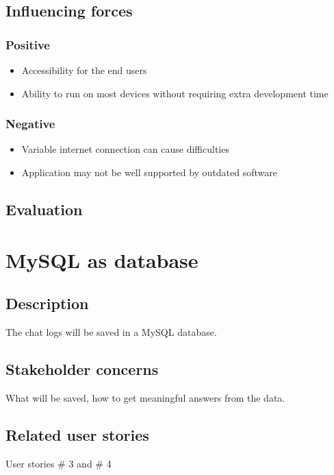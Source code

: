 \documentclass[12pt, a4paper]{article}
\begin{document}
\subsection{Influencing forces}
\begin{minipage}{0.5\textwidth}
    \subsubsection*{Positive}
    \begin{itemize}
        \item Accessibility for the end users
        \item Ability to run on most devices without requiring extra development time
    \end{itemize}
\end{minipage}%
\begin{minipage}{0.5\textwidth}
    \subsubsection*{Negative}
    \begin{itemize}
        \item Variable internet connection can cause difficulties
        \item Application may not be well supported by outdated software
    \end{itemize}
\end{minipage}

\subsection{Evaluation}

\newpage
\section{MySQL as database}
\subsection{Description}
The chat logs will be saved in a MySQL database. 
\subsection{Stakeholder concerns}
What will be saved, how to get meaningful answers from the data.
\subsection{Related user stories}
User stories \# 3 and \# 4 
\end{document}

